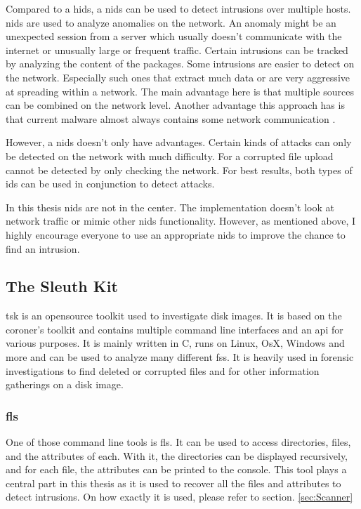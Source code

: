 Compared to a \gls{hids}, a \gls{nids} can be used to detect intrusions over multiple hosts. \gls{nids} are used to analyze anomalies on the network. An \gls{anomaly} might be an unexpected session from a server which usually doesn't communicate with the internet or unusually large or frequent traffic. Certain intrusions can be tracked by analyzing the content of the packages. Some intrusions are easier to detect on the network. Especially such ones that extract much data or are very aggressive at spreading within a network. The main advantage here is that multiple sources can be combined on the network level. Another advantage this approach has is that current \gls{malware} almost always contains some network communication \cite{Malware:Behaviour,nids}.

However, a \gls{nids} doesn't only have advantages. Certain kinds of attacks can only be detected on the network with much difficulty. For a corrupted file upload cannot be detected by only checking the network. For best results, both types of \gls{ids} can be used in conjunction to detect attacks. 

In this thesis \gls{nids} are not in the center. The implementation doesn't look at network traffic or mimic other \gls{nids} functionality. However, as mentioned above, I highly encourage everyone to use an appropriate \gls{nids} to improve the chance to find an intrusion. 

\subsection{The Sleuth Kit}
\label{sec:tsk}

\gls{tsk} is an \gls{opensource} toolkit used to investigate disk images. It is based on the coroner's toolkit \cite{tct} and contains multiple command line interfaces and an \gls{api} for various purposes. \cite{tsk, tsk:about} It is mainly written in C, runs on Linux, OsX, Windows and more and can be used to analyze many different \glspl{fs}. It is heavily used in forensic investigations to find deleted or corrupted files and for other information gatherings on a disk image.

\subsubsection{fls}
\label{sec:fls}

One of those command line tools is fls. It can be used to access directories, files, and the attributes of each. With it, the directories can be displayed recursively, and for each file, the attributes can be printed to the console. \cite{tsk:fls} This tool plays a central part in this thesis as it is used to recover all the files and attributes to detect intrusions. On how exactly it is used, please refer to section. \ref{sec:Scanner}

